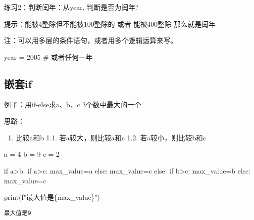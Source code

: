\documentclass[
  letterpaper,
  DIV=11,
  numbers=noendperiod]{scrreprt}
\newenvironment{Shaded}{\begin{snugshade}}{\end{snugshade}}
\newcommand{\BuiltInTok}[1]{\textcolor[rgb]{0.00,0.23,0.31}{#1}}
\newcommand{\CommentTok}[1]{\textcolor[rgb]{0.37,0.37,0.37}{#1}}
\newcommand{\ControlFlowTok}[1]{\textcolor[rgb]{0.00,0.23,0.31}{#1}}
\newcommand{\DecValTok}[1]{\textcolor[rgb]{0.68,0.00,0.00}{#1}}
\newcommand{\NormalTok}[1]{\textcolor[rgb]{0.00,0.23,0.31}{#1}}
\newcommand{\OperatorTok}[1]{\textcolor[rgb]{0.37,0.37,0.37}{#1}}
\newcommand{\SpecialCharTok}[1]{\textcolor[rgb]{0.37,0.37,0.37}{#1}}
\newcommand{\SpecialStringTok}[1]{\textcolor[rgb]{0.13,0.47,0.30}{#1}}
\providecommand{\tightlist}{%
  \setlength{\itemsep}{0pt}\setlength{\parskip}{0pt}}\usepackage{longtable,booktabs,array}
\begin{document}
练习2：判断闰年：从year, 判断是否为闰年?

提示：能被4整除但不能被100整除的 或者 能被400整除 那么就是闰年

注：可以用多层的条件语句，或者用多个逻辑运算来写。

\begin{Shaded}
\begin{Highlighting}[]
\NormalTok{year }\OperatorTok{=} \DecValTok{2005} \CommentTok{\# 或者任何一年}
\end{Highlighting}
\end{Shaded}

\hypertarget{ux5d4cux5957if}{%
\subsection{嵌套if}\label{ux5d4cux5957if}}

例子：用if-else求a、b、c 3个数中最大的一个

思路：

\begin{enumerate}
\def\labelenumi{\arabic{enumi}.}
\tightlist
\item
  比较a和b 1.1. 若a较大，则比较a和c 1.2. 若a较小，则比较b和c
\end{enumerate}

\begin{Shaded}
\begin{Highlighting}[]
\NormalTok{a }\OperatorTok{=} \DecValTok{4}
\NormalTok{b }\OperatorTok{=} \DecValTok{9}
\NormalTok{c }\OperatorTok{=} \DecValTok{2}

\ControlFlowTok{if}\NormalTok{ a}\OperatorTok{\textgreater{}}\NormalTok{b:}
    \ControlFlowTok{if}\NormalTok{ a}\OperatorTok{\textgreater{}}\NormalTok{c:}
\NormalTok{        max\_value}\OperatorTok{=}\NormalTok{a}
    \ControlFlowTok{else}\NormalTok{:}
\NormalTok{        max\_value}\OperatorTok{=}\NormalTok{c}
\ControlFlowTok{else}\NormalTok{:}
    \ControlFlowTok{if}\NormalTok{ b}\OperatorTok{\textgreater{}}\NormalTok{c:}
\NormalTok{        max\_value}\OperatorTok{=}\NormalTok{b}
    \ControlFlowTok{else}\NormalTok{:}
\NormalTok{        max\_value}\OperatorTok{=}\NormalTok{c}
  
\BuiltInTok{print}\NormalTok{(}\SpecialStringTok{f"最大值是}\SpecialCharTok{\{}\NormalTok{max\_value}\SpecialCharTok{\}}\SpecialStringTok{"}\NormalTok{)     }
\end{Highlighting}
\end{Shaded}

\begin{verbatim}
最大值是9
\end{verbatim}
\end{document}

